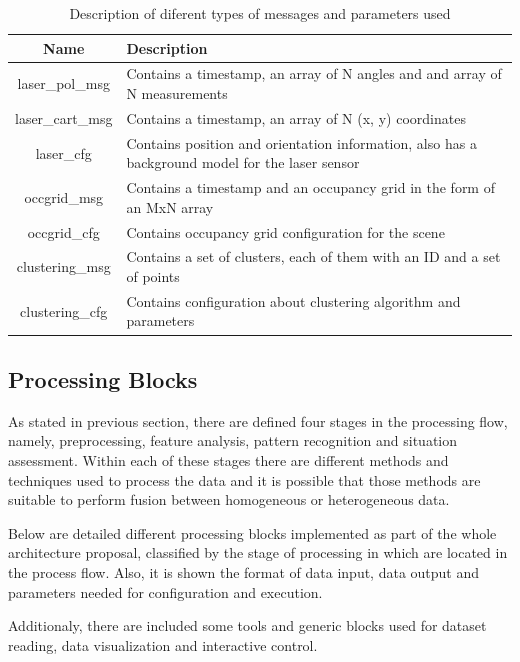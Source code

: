 \begin{table}[ht!]
\footnotesize
\centering
\begin{tabular}{|c | p{8cm}|}
\hline
\textbf{Name} & \textbf{Description} \\
\hline
laser\_pol\_msg & Contains a timestamp, an array of N angles and and array of N measurements \\
\hline
laser\_cart\_msg & Contains a timestamp, an array of N (x, y) coordinates \\
\hline
laser\_cfg & Contains position and orientation information, also has a background model for the laser sensor \\
\hline
occgrid\_msg & Contains a timestamp and an occupancy grid in the form of an MxN array \\
\hline
occgrid\_cfg & Contains occupancy grid configuration for the scene \\
\hline
clustering\_msg & Contains a set of clusters, each of them with an ID and a set of points \\
\hline
clustering\_cfg & Contains configuration about clustering algorithm and parameters \\
\hline
\end{tabular}
\caption{Description of diferent types of messages and parameters used}
\label{desc_map}
\end{table}



\subsection{Processing Blocks}

As stated in previous section, there are defined four stages in the processing flow, namely, preprocessing, feature analysis, pattern recognition and situation assessment. Within each of these stages there are different methods and techniques used to process the data and it is possible that those methods are suitable to perform fusion between homogeneous or heterogeneous data.

Below are detailed different processing blocks implemented as part of the whole architecture proposal, classified by the stage of processing in which are located in the process flow. Also, it is shown the format of data input, data output and parameters needed for configuration and execution.

Additionaly, there are included some tools and generic blocks used for dataset reading, data visualization and interactive control.

